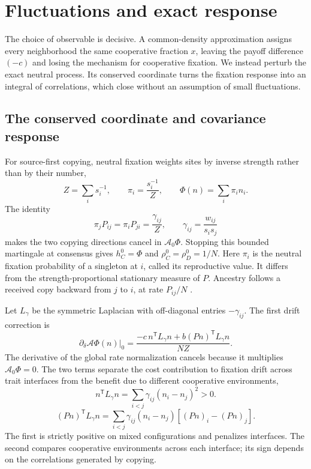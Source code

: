 \documentclass[aps,pre,reprint,amsmath,amssymb,longbibliography]{revtex4-2}
\newcommand{\T}{\mathsf T}
\begin{document}
\section{Fluctuations and exact response}
\label{sec:response-theory}
The choice of observable is decisive. A common-density approximation
assigns every neighborhood the same cooperative fraction $x$, leaving
the payoff difference $(-c)$ and losing the mechanism for cooperative
fixation. We instead perturb the exact neutral process. Its conserved
coordinate turns the fixation response into an integral of correlations,
which close without an assumption of small fluctuations.

\subsection{The conserved coordinate and covariance response}
\label{sec:neutral-coordinate}\label{sec:absorbing-response}
For source-first copying, neutral fixation weights sites by inverse
strength rather than by their number,
\begin{equation}
 Z=\sum_i s_i^{-1},\qquad
 \pi_i=\frac{s_i^{-1}}Z,\qquad
 \Phi(n)=\sum_i\pi_i n_i .
 \label{eq:reproductive}
\end{equation}
The identity
\begin{equation}
 \pi_jP_{ij}=\pi_iP_{ji}
 =\frac{\gamma_{ij}}Z,\qquad
 \gamma_{ij}=\frac{w_{ij}}{s_is_j}
 \label{eq:edge-balance}
\end{equation}
makes the two copying directions cancel in $\mathcal A_0\Phi$.
Stopping this bounded martingale at consensus gives $h_C^0=\Phi$ and
$\rho_C^0=\rho_D^0=1/N$. Here $\pi_i$ is the neutral fixation probability of a singleton at $i$,
called its reproductive value. It differs from the strength-proportional
stationary measure of $P$. Ancestry follows a
received copy backward from $j$ to $i$, at rate $P_{ij}/N$
\cite{Maciejewski2014,SoodAntalRedner2008}.

Let $L_\gamma$ be the symmetric Laplacian with off-diagonal entries
$-\gamma_{ij}$. The first drift correction is
\begin{equation}
 \left.\partial_\delta\mathcal A\Phi(n)\right|_0
 =\frac{-c\,n^\T L_\gamma n+
               b(Pn)^\T L_\gamma n}{NZ}.
 \label{eq:drift}
\end{equation}
The derivative of the global rate normalization cancels because it
multiplies $\mathcal A_0\Phi=0$. The two terms separate the cost contribution to fixation drift across
trait interfaces from the benefit due to different cooperative environments,
\begin{equation}
 n^\T L_\gamma n=\sum_{i<j}\gamma_{ij}(n_i-n_j)^2>0.
 \label{eq:dirichlet}
\end{equation}
\begin{equation}
 (Pn)^\T L_\gamma n=
 \sum_{i<j}\gamma_{ij}(n_i-n_j)[(Pn)_i-(Pn)_j].
 \label{eq:benefit}
\end{equation}
The first is strictly positive on mixed configurations and penalizes
interfaces. The second compares cooperative environments across each
interface; its sign depends on the correlations generated by copying.
\end{document}

